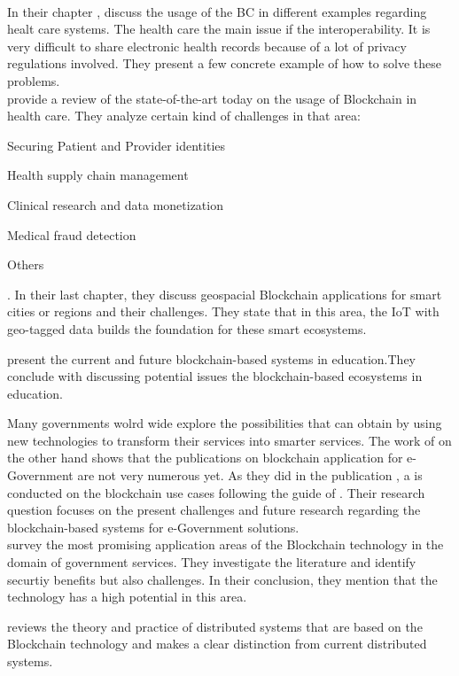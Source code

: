 \begin{description}[noitemsep,align=left]
	\\ In their chapter , \citet[chap. 3.B]{2017_Tama} discuss the usage of the BC in different examples regarding healt care systems. The health care the main issue if the interoperability. It is very difficult to share electronic health records because of a lot of privacy regulations involved. They present a few concrete example of how to solve these problems.\\
	\citet{2018_Boulos} provide a review of the state-of-the-art today on the usage of Blockchain in health care. They analyze certain kind of challenges in that area: 
\begin{enumerate*}[label={\arabic*)},font={\color{red!50!black}\bfseries}]
	\item Securing Patient and Provider identities
	\item Health supply chain management
	\item Clinical research and data monetization
	\item Medical fraud detection
	\item Others
\end{enumerate*}.
In their last chapter, they discuss geospacial Blockchain applications for smart cities or regions and their challenges. They state that in this area, the IoT with geo-tagged data builds the foundation for these smart ecosystems. 
	\item[Education] \citet{2018_Chen} present the  current and future blockchain-based systems in education.They conclude with discussing potential issues the blockchain-based ecosystems in education.
	\item[Government] Many governments wolrd wide explore the possibilities that can obtain by using new technologies to transform their services into smarter services. The work of \citet{2018_Batubara} on the other hand shows that the publications on blockchain application for e-Government are not very numerous yet. As they did in the publication \cite{2016_Conoscenti}, a  is conducted on the blockchain use cases following the guide of \citet{2007_Kitchenham}. Their research question focuses on the present challenges and future research regarding the blockchain-based systems for e-Government solutions.\\ \citet{2018_Alketbi} survey the most promising application areas of the Blockchain technology in the domain of government services. They investigate the literature and identify securtiy benefits but also challenges. In their conclusion, they mention that the technology has a high potential in this area.
	\item[Distributed Computing] \citet{2017_Herlihy} reviews the theory and practice of distributed systems that are based on the Blockchain technology and makes a clear distinction from current distributed systems.
\end{description}

